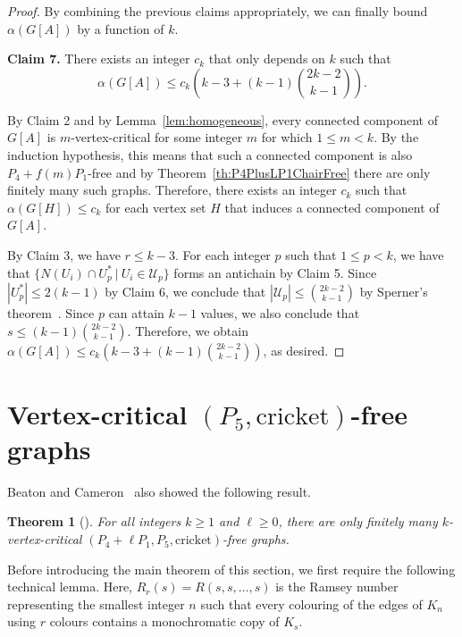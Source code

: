 \documentclass[10pt]{article}
\newtheorem{theorem}[thm]{Theorem}
\theoremstyle{definition}
\begin{document}
\begin{proof}
\bigskip

\noindent

By combining the previous claims appropriately, we can finally bound $\alpha(G[A])$ by a function of $k$.

\noindent \textbf{Claim 7.} There exists an integer $c_k$ that only depends on $k$ such that $$\alpha(G[A]) \leq c_k\left(k-3+(k-1)\binom{2k-2}{k-1}\right).$$

\bigskip


By Claim 2 and by Lemma~\ref{lem:homogeneous}, every connected component of $G[A]$ is $m$-vertex-critical for some integer $m$ for which $1 \leq m < k$. By the induction hypothesis, this means that such a connected component is also $P_4+f(m)P_1$-free and by Theorem~\ref{th:P4PlusLP1ChairFree} there are only finitely many such graphs. Therefore, there exists an integer $c_k$ such that $\alpha(G[H]) \leq c_k$ for each vertex set $H$ that induces a connected component of $G[A]$.

By Claim 3, we have $r \leq k-3$. For each integer $p$ such that $1 \leq p<k$, we have that $\{N(U_i) \cap U_p^*~|~U_i \in \mathcal{U}_p\}$ forms an antichain by Claim 5. Since $|U_p^*| \leq 2(k-1)$ by Claim 6, we conclude that $|\mathcal{U}_p| \leq \binom{2k-2}{k-1}$ by Sperner's theorem~\cite{S28}. Since $p$ can attain $k-1$ values, we also conclude that $s \leq (k-1)\binom{2k-2}{k-1}$. Therefore, we obtain $\alpha(G[A]) \leq c_k\left(k-3+(k-1)\binom{2k-2}{k-1}\right)$, as desired.

\end{proof}

\section{Vertex-critical $(P_5,\text{cricket})$-free graphs}
\label{sec:cricket}
Beaton and Cameron~\cite{BC26} also showed the following result.

\begin{theorem}[\cite{BC26}]
\label{th:P4PlusLP1CricketFree}
    For all integers $k \geq 1$ and $\ell \geq 0$, there are only finitely many $k$-vertex-critical $(P_4+\ell P_1,P_5,\text{cricket})$-free graphs.
\end{theorem}

Before introducing the main theorem of this section, we first require the following technical lemma. Here, $R_r(s)=R(s,s,\ldots,s)$ is the Ramsey number representing the smallest integer $n$ such that every colouring of the edges of
$K_n$ using $r$ colours contains a monochromatic copy of $K_s$.
\end{document}
